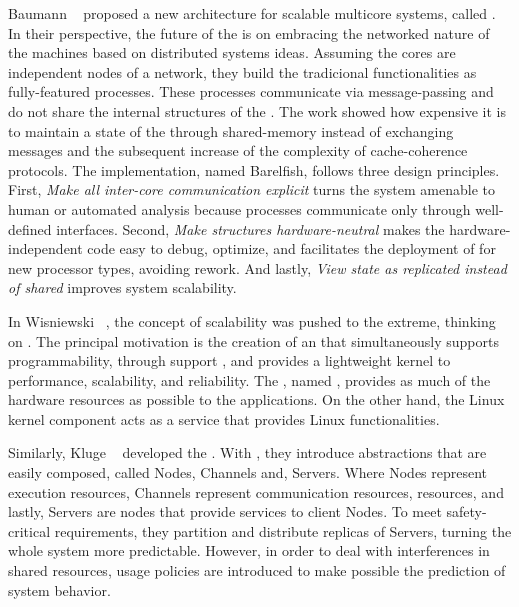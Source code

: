 	Baumann \etal~\cite{Baumann2009} proposed a new \os architecture for scalable multicore
	systems, called \multikernel.
	In their perspective, the future of the \oss is on embracing the networked nature
	of the machines based on distributed systems ideas.
	Assuming the cores are independent nodes of a network, they build the tradicional
	\os functionalities as fully-featured processes.
	These processes communicate via message-passing and do not share the internal
	structures of the \os.
	The work showed how expensive it is to maintain a state of the \os through
	shared-memory instead of exchanging messages and the subsequent increase of
	the complexity of cache-coherence protocols.
	The \multikernel implementation, named Barelfish, follows three design principles.
	First, \textit{Make all inter-core communication explicit} turns the system
	amenable to human or automated analysis because processes communicate only
	through well-defined interfaces.
	Second, \textit{Make \os structures hardware-neutral} makes the hardware-independent
	code easy to debug, optimize, and facilitates the deployment of \os for new
	processor types, avoiding rework.
	And lastly, \textit{View \os state as replicated instead of shared} improves system
	scalability.

	In Wisniewski~\cite{Wisniewski2014} \etal, the concept of scalability was pushed
	to the extreme, thinking on \hpc.
	The principal motivation is the creation of an \os that simultaneously supports
	programmability, through support \linux \api, and provides a lightweight kernel
	to performance, scalability, and reliability.
	The \os, named \mos, provides as much of the hardware resources as
	possible to the \hpc applications.
	On the other hand, the Linux kernel
	component acts as a service that provides Linux functionalities.

	Similarly, Kluge \etal~\cite{kluge2014} developed the \moosca.
	With \moosca, they introduce abstractions that are easily composed, called Nodes,
	Channels and, Servers.
	Where Nodes represent execution resources, Channels represent communication
	resources, \eg \noc resources, and lastly, Servers are nodes that provide
	services to client Nodes.
	To meet safety-critical requirements, they partition \manycore and distribute
	replicas of Servers, turning the whole system more predictable.
	However, in order to deal with interferences in shared resources,
	usage policies are introduced to make possible the prediction of system behavior.

